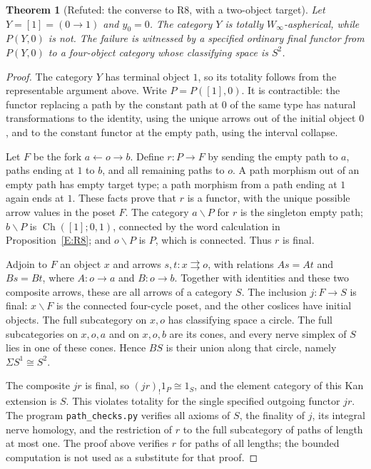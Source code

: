 \documentclass[11pt,a4paper]{article}
\newtheorem{theorem}{Theorem}[section]
\theoremstyle{definition}
\theoremstyle{remark}
\begin{document}
\begin{theorem}[Refuted: the converse to R8, with a two-object target]
\label{E:converse}
Let $Y=[1]=(0\to1)$ and $y_0=0$.  The category $Y$ is totally
$W_\infty$-aspherical, while $P(Y,0)$ is not.  The failure is witnessed
by a specified ordinary final functor from $P(Y,0)$ to a four-object
category whose classifying space is $S^2$.
\end{theorem}
\begin{proof}
The category $Y$ has terminal object $1$, so its totality follows from
the representable argument above.  Write $P=P([1],0)$.  It is
contractible: the functor replacing a path by the constant path at $0$
of the same type has natural transformations to the identity, using
the unique arrows out of the initial object $0$, and to the constant
functor at the empty path, using the interval collapse.

Let $F$ be the fork $a\leftarrow o\to b$.  Define $r:P\to F$ by
sending the empty path to $a$, paths ending at $1$ to $b$, and all
remaining paths to $o$.  A path morphism out of an empty path has empty
target type; a path morphism from a path ending at $1$ again ends at
$1$.  These facts prove that $r$ is a functor, with the unique possible
arrow values in the poset $F$.
The category $a\backslash P$ for $r$ is the singleton empty path;
$b\backslash P$ is $\operatorname{Ch}([1];0,1)$, connected by the
word calculation in Proposition~\ref{E:R8}; and
$o\backslash P$ is $P$, which is connected.  Thus $r$ is final.

Adjoin to $F$ an object $x$ and arrows $s,t:x\rightrightarrows o$,
with relations $As=At$ and $Bs=Bt$, where $A:o\to a$ and $B:o\to b$.
Together with identities and these two composite arrows, these are all
arrows of a category $S$.  The inclusion $j:F\to S$ is final:
$x\backslash F$ is the connected four-cycle poset, and the other
coslices have initial objects.  The full subcategory on $x,o$ has
classifying space a circle.  The full subcategories on $x,o,a$ and on
$x,o,b$ are its cones, and every nerve simplex of $S$ lies in one of
these cones.  Hence $BS$ is their union along that circle, namely
$\Sigma S^1\cong S^2$.

The composite $jr$ is final, so $(jr)_!1_P\cong1_S$, and the element
category of this Kan extension is $S$.  This violates totality for
the single specified outgoing functor $jr$.
The program \texttt{path\_checks.py} verifies all axioms of $S$, the
finality of $j$, its integral nerve homology, and the restriction of
$r$ to the full subcategory of paths of length at most one.  The proof
above verifies $r$ for paths of all lengths; the bounded computation is
not used as a substitute for that proof.
\end{proof}
\end{document}
